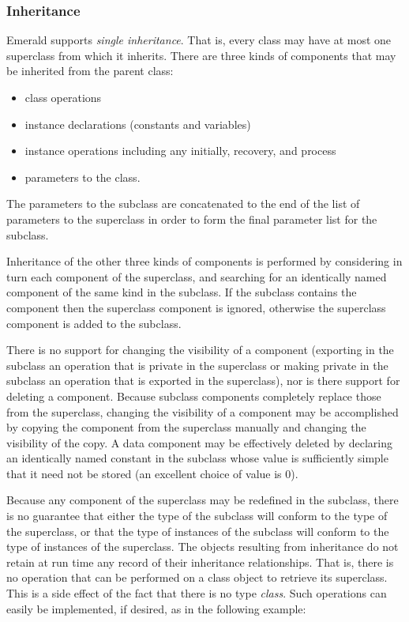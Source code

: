 \subsubsection*{Inheritance}
Emerald supports {\em single inheritance}.  That is, every class may have at
most one superclass from which it inherits.  There are three kinds of
components that may be
inherited from the parent class:
\begin{itemize}
  \item{} class operations
  \item{} instance declarations (constants and variables)
  \item{} instance operations including any initially, recovery, and process
  \item{} parameters to the class.
\end{itemize}
The parameters to the subclass are concatenated to the end of the list of
parameters to the
superclass in order to form the final parameter list for the subclass.

Inheritance of the other three kinds of components is performed by
considering in turn each component of the 
superclass, and searching for an identically named component of the same
kind in the subclass.  If the subclass contains the component then the
superclass component is ignored, otherwise the superclass component is added
to the subclass.

There is no support for changing the visibility of a component (exporting in
the subclass an
operation that is private in the superclass or making private in the
subclass an operation
that is exported in the superclass), nor is there support for deleting a
component.  Because subclass components completely replace those from the
superclass, changing the visibility of a component may be accomplished by
copying the component from the superclass manually and changing the
visibility of the copy.
A data component may be effectively deleted by declaring an
identically named constant in the subclass whose value is sufficiently
simple that it need not be stored (an excellent choice of value is 0).

Because any component of the superclass may be redefined in the subclass,
there is no guarantee that either the type of the subclass will conform to
the type of the superclass, or that the type of instances of the subclass
will conform to the type of instances of the superclass.
The objects resulting from inheritance do not
retain at run time any record of their inheritance relationships.  That is,
there is no operation that can be performed on a class object to retrieve
its superclass.  This is a
side effect of the fact that there is no type {\it class}.  Such operations
can easily be implemented, if desired, as in the following example:

